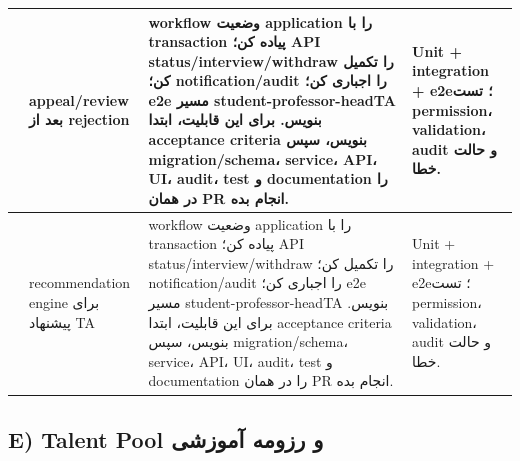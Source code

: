 \documentclass[11pt,a4paper]{article}
\begin{document}
\begin{longtable}{|>{\raggedleft\arraybackslash}p{}|>{\raggedleft\arraybackslash}p{}|>{\raggedleft\arraybackslash}p{}|>{\raggedleft\arraybackslash}p{}|}
74 & appeal/review بعد از rejection & workflow وضعیت application را با transaction پیاده کن؛ API status/interview/withdraw را تکمیل کن؛ notification/audit را اجباری کن؛ e2e مسیر student-professor-headTA بنویس. برای این قابلیت، ابتدا acceptance criteria بنویس، سپس migration/schema، service، API، UI، audit، test و documentation را در همان PR انجام بده. & Unit + integration + e2e؛ تست permission، validation، audit و حالت خطا. \\ \hline
75 & recommendation engine برای پیشنهاد TA & workflow وضعیت application را با transaction پیاده کن؛ API status/interview/withdraw را تکمیل کن؛ notification/audit را اجباری کن؛ e2e مسیر student-professor-headTA بنویس. برای این قابلیت، ابتدا acceptance criteria بنویس، سپس migration/schema، service، API، UI، audit، test و documentation را در همان PR انجام بده. & Unit + integration + e2e؛ تست permission، validation، audit و حالت خطا. \\ \hline
\end{longtable}
\subsection{E) Talent Pool و رزومه آموزشی}
\end{document}
